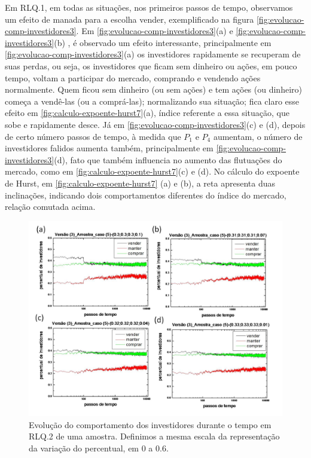 \documentclass[brazil,ruledheader]{abnt}
\begin{document}
Em RLQ.1, em todas as situações, nos primeiros passos de tempo, observamos um
efeito de manada para a escolha vender, exemplificado na figura
\ref{fig:evolucao-comp-investidores3}. Em
\ref{fig:evolucao-comp-investidores3}(a) e
\ref{fig:evolucao-comp-investidores3}(b) , é observado um efeito interessante,
principalmente em \ref{fig:evolucao-comp-investidores3}(a) os
investidores rapidamente se recuperam de suas perdas, ou seja, os investidores
que ficam sem dinheiro ou ações, em pouco tempo, voltam a participar do mercado,
comprando e vendendo ações normalmente. Quem ficou sem dinheiro (ou sem ações) e
tem ações (ou dinheiro) começa a vendê-las (ou a comprá-las); normalizando sua
situação; fica claro esse efeito em \ref{fig:calculo-expoente-hurst7}(a),
índice referente a essa situação, que sobe e rapidamente desce.  Já em
\ref{fig:evolucao-comp-investidores3}(c) e (d), depois de certo número passos de
tempo, à medida que $P_1$ e $P_4$ aumentam, o número de investidores falidos
aumenta também, principalmente em \ref{fig:evolucao-comp-investidores3}(d),
fato que também influencia no aumento das flutuações do mercado, como em
\ref{fig:calculo-expoente-hurst7}(c) e (d). No cálculo do expoente de
Hurst, em \ref{fig:calculo-expoente-hurst7} (a) e (b), a reta apresenta
duas inclinações, indicando dois comportamentos diferentes do índice do mercado,
relação comutada acima.

\begin{figure}[!h]
\centering
\includegraphics[width=0.8\linewidth]{Figuras/20.jpg}
\caption [Evolução do comportamento dos investidores em RLQ.2]{Evolução do
comportamento dos investidores durante o tempo em RLQ.2 de uma amostra.
Definimos a mesma escala da representação da variação do percentual, em 0 a
0.6. }
\label{fig:evolucao-comp-investidores4}
\end{figure}
\end{document}
